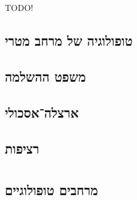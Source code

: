\documentclass[name=רשימות טופולוגיה כללית]{../../../tex/classes/noChapterMegasumPreamble}
\begin{document}
	
	
	\newpage
	\setcounter{tocdepth}{3} %
	\tableofcontents
	
	
	
	
\section[מרחבים מטריים]{}
	TODO!
\subsection{טופולוגיה של מרחב מטרי}
\subsection{משפט ההשלמה}
\subsection{ארצלה־אסכולי}
\subsection{רציפות}
	
	
	\npage
\section[מבוא]{\label{s:intro}}
\subsection{\label{ss:topoSpaces}מרחבים טופולוגיים}
\end{document}
